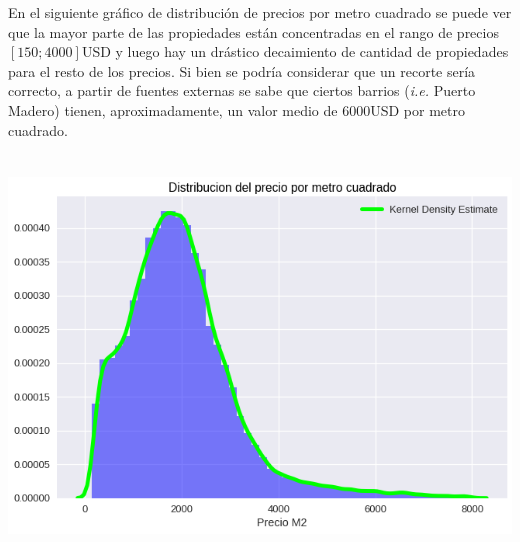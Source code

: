 \documentclass[a4paper, 10pt]{article}
\newcommand\tab[1][0.5cm]{\hspace*{#1}}
\begin{document}
				\tab En el siguiente gráfico de distribución de precios por metro cuadrado se puede ver que la mayor parte
				de las propiedades están concentradas en el rango de precios $[150;4000]$USD y luego hay un drástico decaimiento
				de cantidad de propiedades para el resto de los precios. Si bien se podría considerar que un recorte sería
				correcto, a partir de fuentes externas se sabe que ciertos barrios (\emph{i.e.} Puerto Madero) tienen,
				aproximadamente, un valor medio de $6000$USD por metro cuadrado.
				\begin{center}
       				\includegraphics[width=6in, height=4.2in]{images/m2Histogram}
		   		\end{center}
\end{document}
